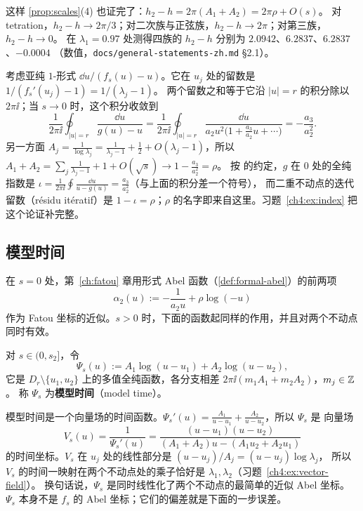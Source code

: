 这样 \cref{prop:scales}(4) 也证完了：$h_2-h=2\pi(A_1+A_2)=2\pi\rho+O(s)$。
对 tetration，$h_2-h\to2\pi/3$；对二次族与正弦族，$h_2-h\to2\pi$；对第三族，$h_2-h\to0$。
\cite{KneserPaper} 在 $\lambda_1=0.97$ 处测得四族的 $h_2-h$ 分别为 $2.0942$、$6.2837$、$6.2837$、$-0.0004$
（数值，\texttt{docs/general-statements-zh.md} §2.1）。

\begin{remark}\label{ch4:rem:why-rho}
考虑亚纯 $1$-形式 $\dd u/(f_s(u)-u)$。它在 $u_j$ 处的留数是 $1/(f_s'(u_j)-1)=1/(\lambda_j-1)$。
两个留数之和等于它沿 $|u|=r$ 的积分除以 $2\pi\ii$；当 $s\to0$ 时，这个积分收敛到
\[
 \frac1{2\pi\ii}\oint_{|u|=r}\frac{\dd u}{g(u)-u}
 =\frac1{2\pi\ii}\oint_{|u|=r}\frac{\dd u}{a_2u^2\bigl(1+\frac{a_3}{a_2}u+\cdots\bigr)}
 =-\frac{a_3}{a_2^2}.
\]
另一方面 $A_j=\frac1{\log\lambda_j}=\frac1{\lambda_j-1}+\frac12+O(\lambda_j-1)$，所以
$A_1+A_2=\sum_j\frac1{\lambda_j-1}+1+O(\sqrt s)\to1-\frac{a_3}{a_2^2}=\rho$。
按 \cite{Milnor2006} 的约定，$g$ 在 $0$ 处的全纯指数是 $\iota=\frac1{2\pi\ii}\oint\frac{\dd u}{u-g(u)}=\frac{a_3}{a_2^2}$（与上面的积分差一个符号），
而二重不动点的迭代留数（résidu itératif）是 $1-\iota=\rho$；$\rho$ 的名字即来自这里。习题~\ref{ch4:ex:index} 把这个论证补完整。
\end{remark}

\subsection{模型时间}

在 $s=0$ 处，第~\ref{ch:fatou} 章用形式 Abel 函数（\cref{def:formal-abel}）的前两项
\[
 \alpha_2(u):=-\frac1{a_2u}+\rho\log(-u)
\]
作为 Fatou 坐标的近似。$s>0$ 时，下面的函数起同样的作用，并且对两个不动点同时有效。

\begin{definition}[模型时间]\label{ch4:def:model-time}
对 $s\in(0,s_2]$，令
\[
 \Psi_s(u):=A_1\log(u-u_1)+A_2\log(u-u_2),
\]
它是 $D_r\setminus\{u_1,u_2\}$ 上的多值全纯函数，各分支相差 $2\pi\ii(m_1A_1+m_2A_2)$，$m_j\in\mathbb{Z}$。
称 $\Psi_s$ 为\textbf{模型时间}（model time）。
\end{definition}

模型时间是一个向量场的时间函数。$\Psi_s'(u)=\frac{A_1}{u-u_1}+\frac{A_2}{u-u_2}$，所以 $\Psi_s$ 是
向量场
\[
 V_s(u)=\frac1{\Psi_s'(u)}=\frac{(u-u_1)(u-u_2)}{(A_1+A_2)u-(A_1u_2+A_2u_1)}
\]
的时间坐标。$V_s$ 在 $u_j$ 处的线性部分是 $(u-u_j)/A_j=(u-u_j)\log\lambda_j$，
所以 $V_s$ 的时间一映射在两个不动点处的乘子恰好是 $\lambda_1,\lambda_2$（习题~\ref{ch4:ex:vector-field}）。
换句话说，$\Psi_s$ 是同时线性化了两个不动点的最简单的近似 Abel 坐标。
$\Psi_s$ 本身不是 $f_s$ 的 Abel 坐标；它们的偏差就是下面的一步误差。

